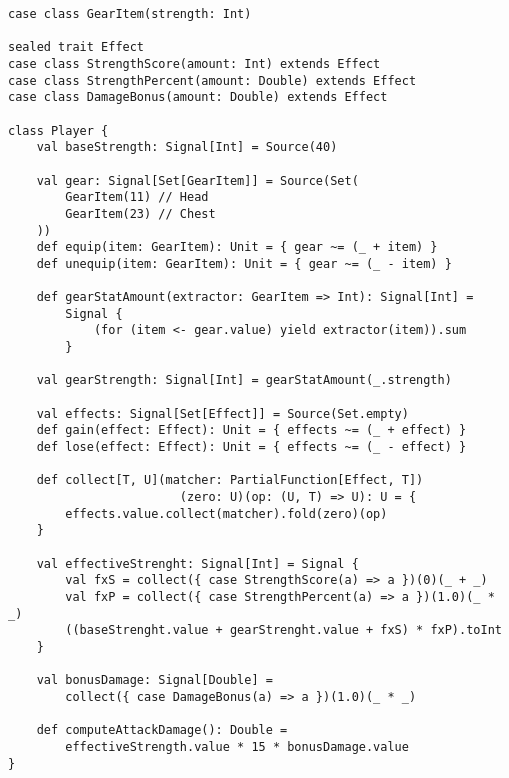 \newpage
\begin{lstlisting}
case class GearItem(strength: Int)

sealed trait Effect
case class StrengthScore(amount: Int) extends Effect
case class StrengthPercent(amount: Double) extends Effect
case class DamageBonus(amount: Double) extends Effect

class Player {
	val baseStrength: Signal[Int] = Source(40)
	
	val gear: Signal[Set[GearItem]] = Source(Set(
		GearItem(11) // Head
		GearItem(23) // Chest
	))
	def equip(item: GearItem): Unit = { gear ~= (_ + item) }
	def unequip(item: GearItem): Unit = { gear ~= (_ - item) }
	
	def gearStatAmount(extractor: GearItem => Int): Signal[Int] =
		Signal {
			(for (item <- gear.value) yield extractor(item)).sum
		}
	
	val gearStrength: Signal[Int] = gearStatAmount(_.strength)
	
	val effects: Signal[Set[Effect]] = Source(Set.empty)
	def gain(effect: Effect): Unit = { effects ~= (_ + effect) }
	def lose(effect: Effect): Unit = { effects ~= (_ - effect) }
	
	def collect[T, U](matcher: PartialFunction[Effect, T])
	                    (zero: U)(op: (U, T) => U): U = {
		effects.value.collect(matcher).fold(zero)(op)
	}
	
	val effectiveStrenght: Signal[Int] = Signal {
		val fxS = collect({ case StrengthScore(a) => a })(0)(_ + _)
		val fxP = collect({ case StrengthPercent(a) => a })(1.0)(_ * _)
		((baseStrenght.value + gearStrenght.value + fxS) * fxP).toInt
	}
	
	val bonusDamage: Signal[Double] = 
		collect({ case DamageBonus(a) => a })(1.0)(_ * _)
	
	def computeAttackDamage(): Double =
		effectiveStrength.value * 15 * bonusDamage.value
}
\end{lstlisting}

